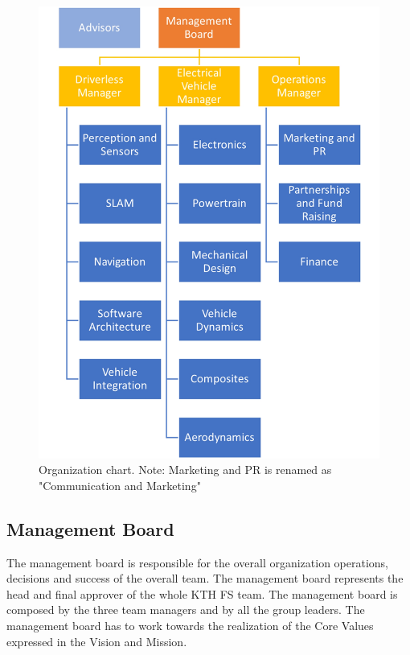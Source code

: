 \documentclass[graybox]{svmult}
\begin{document}
\begin{figure}
    \centering
    \includegraphics[scale=.60]{organigramma.jpg}
    \caption{Organization chart. Note: Marketing and PR is renamed as "Communication and Marketing"}
    \label{fig:chart}
\end{figure}

\subsection{Management Board}
The management board is responsible for the overall organization operations, decisions and success of the overall team. The management board represents the head and final approver of the whole KTH FS team. The management board is composed by the three team managers and by all the group leaders. The management board has to work towards the realization of the Core Values expressed in the Vision and Mission.
\end{document}
